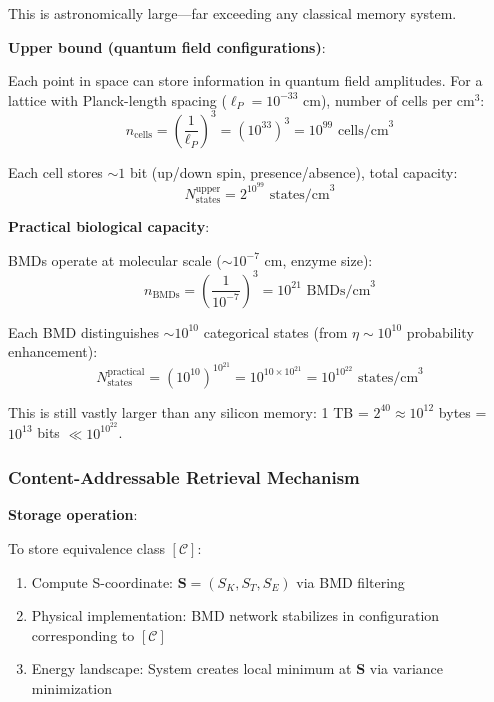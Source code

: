 \documentclass[11pt,a4paper]{article}
\begin{document}
This is astronomically large—far exceeding any classical memory system.

\textbf{Upper bound (quantum field configurations)}:

Each point in space can store information in quantum field amplitudes. For a lattice with Planck-length spacing ($\ell_P = 10^{-33}$ cm), number of cells per cm$^3$:
\begin{equation}
n_{\text{cells}} = \left(\frac{1}{\ell_P}\right)^3 = (10^{33})^3 = 10^{99} \text{ cells/cm}^3
\end{equation}

Each cell stores $\sim 1$ bit (up/down spin, presence/absence), total capacity:
\begin{equation}
N_{\text{states}}^{\text{upper}} = 2^{10^{99}} \text{ states/cm}^3
\end{equation}

\textbf{Practical biological capacity}:

BMDs operate at molecular scale ($\sim 10^{-7}$ cm, enzyme size):
\begin{equation}
n_{\text{BMDs}} = \left(\frac{1}{10^{-7}}\right)^3 = 10^{21} \text{ BMDs/cm}^3
\end{equation}

Each BMD distinguishes $\sim 10^{10}$ categorical states (from $\eta \sim 10^{10}$ probability enhancement):
\begin{equation}
N_{\text{states}}^{\text{practical}} = (10^{10})^{10^{21}} = 10^{10 \times 10^{21}} = 10^{10^{22}} \text{ states/cm}^3
\end{equation}

This is still vastly larger than any silicon memory: 1 TB = $2^{40} \approx 10^{12}$ bytes = $10^{13}$ bits $\ll 10^{10^{22}}$.

\subsubsection{Content-Addressable Retrieval Mechanism}

\textbf{Storage operation}:

To store equivalence class $[\mathcal{C}]$:
\begin{enumerate}
\item Compute S-coordinate: $\mathbf{S} = (S_K, S_T, S_E)$ via BMD filtering
\item Physical implementation: BMD network stabilizes in configuration corresponding to $[\mathcal{C}]$
\item Energy landscape: System creates local minimum at $\mathbf{S}$ via variance minimization
\end{enumerate}
\end{document}
